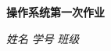 \begin{center}
  \LARGE \bf 操作系统第一次作业
\end{center}

\begin{center}
  \emph{姓名} \underline{\makebox[7em][c]{\name}}
  \emph{学号} \underline{\makebox[12em][c]{\studentNum}}
  \emph{班级} \underline{\makebox[15em][c]{\class}}\\
\end{center}
